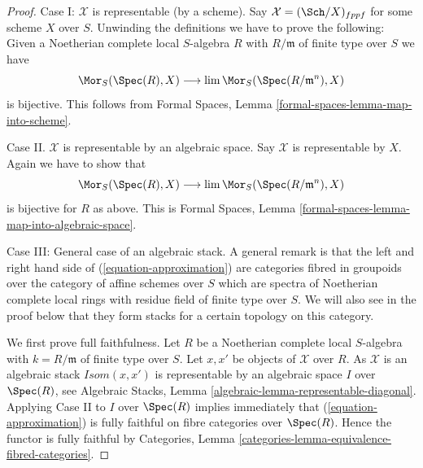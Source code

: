 \begin{proof}
Case I: $\mathcal{X}$ is representable (by a scheme). Say
$\mathcal{X} = (\Sch/X)_{fppf}$ for some scheme $X$ over $S$.
Unwinding the definitions we have to prove the following: Given
a Noetherian complete local $S$-algebra $R$ with $R/\mathfrak m$ of
finite type over $S$ we have
$$
\Mor_S(\Spec(R), X) \longrightarrow \lim \Mor_S(\Spec(R/\mathfrak m^n), X)
$$
is bijective. This follows from Formal Spaces, Lemma
\ref{formal-spaces-lemma-map-into-scheme}.

\medskip\noindent
Case II. $\mathcal{X}$ is representable by an algebraic space. Say
$\mathcal{X}$ is representable by $X$. Again we have to show that
$$
\Mor_S(\Spec(R), X) \longrightarrow \lim \Mor_S(\Spec(R/\mathfrak m^n), X)
$$
is bijective for $R$ as above. This is Formal Spaces, Lemma
\ref{formal-spaces-lemma-map-into-algebraic-space}.

\medskip\noindent
Case III: General case of an algebraic stack. A general remark is that
the left and right hand side of (\ref{equation-approximation}) are
categories fibred in groupoids over the category of affine schemes
over $S$ which are spectra of Noetherian complete local rings
with residue field of finite type over $S$. We will also see in the
proof below that they form stacks for a certain topology on this
category.

\medskip\noindent
We first prove full faithfulness. Let $R$ be a Noetherian complete
local $S$-algebra with $k = R/\mathfrak m$ of finite type over $S$.
Let $x, x'$ be objects of $\mathcal{X}$ over $R$. As $\mathcal{X}$ is
an algebraic stack $\mathit{Isom}(x, x')$ is representable by an
algebraic space $I$ over $\Spec(R)$, see
Algebraic Stacks, Lemma \ref{algebraic-lemma-representable-diagonal}.
Applying Case II to $I$ over $\Spec(R)$ implies immediately that
(\ref{equation-approximation}) is fully faithful on fibre categories over
$\Spec(R)$. Hence the functor is fully faithful by
Categories, Lemma \ref{categories-lemma-equivalence-fibred-categories}.


\end{proof}
